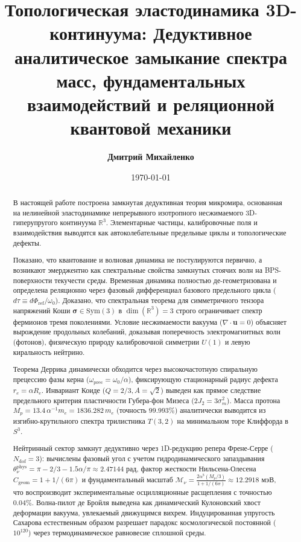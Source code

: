 \documentclass[12pt,a4paper]{article}
\title{\textbf{Топологическая эластодинамика 3D-континуума: Дедуктивное аналитическое замыкание спектра масс, фундаментальных взаимодействий и реляционной квантовой механики}}
\author{\textbf{Дмитрий Михайленко}}
\date{\today}
\begin{document}
	
	\maketitle

	\begin{abstract}
		В настоящей работе построена замкнутая дедуктивная теория микромира, основанная на нелинейной эластодинамике непрерывного изотропного несжимаемого 3D-гиперупругого континуума $\mathbb{R}^3$. Элементарные частицы, калибровочные поля и взаимодействия выводятся как автоколебательные предельные циклы и топологические дефекты. 
		
		Показано, что квантование и волновая динамика не постулируются первично, а возникают эмерджентно как спектральные свойства замкнутых стоячих волн на BPS-поверхности текучести среды. Временная динамика полностью де-геометризована и определена реляционно через фазовый дифференциал базового предельного цикла ($d\tau \equiv d\Phi_{\text{ref}}/\omega_0$). Доказано, что спектральная теорема для симметричного тензора напряжений Коши $\boldsymbol{\sigma} \in \mathrm{Sym}(3)$ в $\dim(\mathbb{R}^3) = 3$ строго ограничивает спектр фермионов тремя поколениями. Условие несжимаемости вакуума ($\nabla \cdot \mathbf{u} = 0$) объясняет вырождение продольных колебаний, доказывая поперечность электромагнитных волн (фотонов), физическую природу калибровочной симметрии $U(1)$ и левую киральность нейтрино.
		
		Теорема Деррика динамически обходится через высокочастотную спиральную прецессию фазы керна ($\omega_{\text{prec}} = \omega_0 / \alpha$), фиксирующую стационарный радиус дефекта $r_e = \alpha R_e$. Инвариант Коиде ($Q = 2/3, A = \sqrt{2}$) выведен как прямое следствие предельного критерия пластичности Губера-фон Мизеса ($2J_2 = 3\sigma_m^2$). Масса протона $M_p = 13.4 \, \alpha^{-1} m_e = 1836.282 \, m_e$ (точность $99.993\%$) аналитически выводится из изгибно-крутильного спектра трилистника $T(3,2)$ на минимальном торе Клиффорда в $S^3$.
		
		Нейтринный сектор замкнут дедуктивно через 1D-редукцию репера Френе-Серре ($N_{\text{dof}} = 3$): вычислены фазовый угол с учетом гидродинамического запаздывания $\theta_\nu^{\text{phys}} = \pi - 2/3 - 1.5\alpha/\pi \approx 2.47144$ рад, фактор жесткости Нильсена-Олесена $C_{\text{geom}} = 1 + 1/(6\pi)$ и фундаментальный масштаб $\mathcal{M}_\nu = \frac{2\alpha^5(M_p/3)}{1 + 1/(6\pi)} \approx 12.2918$ мэВ, что воспроизводит экспериментальные осцилляционные расщепления с точностью $0.04\%$. Волна-пилот де Бройля выведена как динамический Кулоновский хвост деформации вакуума, увлекаемый движущимся вихрем. Индуцированная упругость Сахарова естественным образом разрешает парадокс космологической постоянной ($10^{120}$) через термодинамическое равновесие сплошной среды.
	\end{abstract}
	
\end{document}
